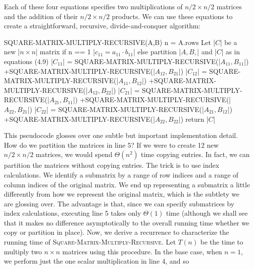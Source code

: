 \documentclass{report}
\begin{document}
        Each of these four equations specifies two multiplications of $n/2 \times n/2$ matrices
        and the addition of their $n/2 \times n/2$ products. We can use these equations to create
        a straightforward, recursive, divide-and-conquer algorithm:
        \bigbreak \noindent 
        \begin{cppcode}
        SQUARE-MATRIX-MULTIPLY-RECURSIVE(A,B)
            n = A.rows
            Let |$C$| be a new |$n\times n$| matrix
            if n == 1
                |$c_{11} = a_{11} \cdot b_{11}$|
            else partition |$A, B,$| and |$C$| as in equations (4.9)
                |$C_{11}$| = SQUARE-MATRIX-MULTIPLY-RECURSIVE(|$A_{11}, B_{11}$|)
                    +SQUARE-MATRIX-MULTIPLY-RECURSIVE(|$A_{12}, B_{21}$|)
                |$C_{12}$| = SQUARE-MATRIX-MULTIPLY-RECURSIVE(|$A_{11}, B_{12}$|)
                    +SQUARE-MATRIX-MULTIPLY-RECURSIVE(|$A_{12}, B_{22}$|)
                |$C_{21}$| = SQUARE-MATRIX-MULTIPLY-RECURSIVE(|$A_{21}, B_{11}$|)
                    +SQUARE-MATRIX-MULTIPLY-RECURSIVE(|$A_{22}, B_{21}$|)
                |$C_{22}$| = SQUARE-MATRIX-MULTIPLY-RECURSIVE(|$A_{21}, B_{12}$|)
                    +SQUARE-MATRIX-MULTIPLY-RECURSIVE(|$A_{22}, B_{22}$|)
            return |$C$|
        \end{cppcode}
        \bigbreak \noindent 
        This pseudocode glosses over one subtle but important implementation detail.
        How do we partition the matrices in line 5? If we were to create 12 new $n/2 \times n/2$
        matrices, we would spend $\Theta(n^2)$ time copying entries. In fact, we can partition
        the matrices without copying entries. The trick is to use index calculations. We
        identify a submatrix by a range of row indices and a range of column indices of
        the original matrix. We end up representing a submatrix a little differently from
        how we represent the original matrix, which is the subtlety we are glossing over.
        The advantage is that, since we can specify submatrices by index calculations,
        executing line 5 takes only $\Theta(1)$ time (although we shall see that it makes no
        difference asymptotically to the overall running time whether we copy or partition
        in place).
        \bigbreak \noindent 
        Now, we derive a recurrence to characterize the running time of \textsc{Square-Matrix-Multiply-Recursive}. Let $T(n)$ be the time to multiply two $n \times n$
        matrices using this procedure. In the base case, when $n = 1$, we perform just the
        one scalar multiplication in line 4, and so
\end{document}
